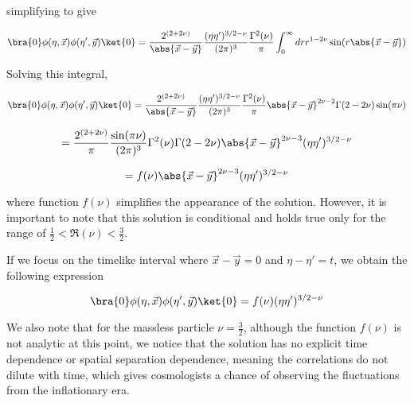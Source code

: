 \documentclass[a4paper,11pt]{article}
\numberwithin{equation}{section}
\numberwithin{figure}{section}
\begin{document}
\begin{large}
simplifying to give

\begin{equation}
\label{2pointsol eta<<1}    
    \bra{0} \phi(\eta,\Vec{x})\phi(\eta',\Vec{y})\ket{0}=\frac{2^{(2+2\nu)}}{\abs{\Vec{x}-\Vec{y}}}\frac{(\eta\eta')^{3/2-\nu}}{(2\pi)^3}\frac{\Gamma^2(\nu)}{\pi}\int^\infty_0 dr r^{1-2\nu} \sin(r \abs{\Vec{x}-\Vec{y}}) 
\end{equation}


\newpage

Solving this integral,

\begin{equation}
\label{2pointfinalsol eta<<1}    
    \bra{0} \phi(\eta,\Vec{x})\phi(\eta',\Vec{y})\ket{0}=\frac{2^{(2+2\nu)}}{\abs{\Vec{x}-\Vec{y}}}\frac{(\eta\eta')^{3/2-\nu}}{(2\pi)^3}\frac{\Gamma^2(\nu)}{\pi} \abs{\Vec{x}-\Vec{y}}^{2\nu-2}\Gamma(2-2\nu) \sin(\pi\nu)
\end{equation}

\begin{equation}
\label{2pointfinalsol2 eta<<1}    
    =\frac{2^{(2+2\nu)}}{\pi}\frac{\sin(\pi\nu)}{(2\pi)^3}\Gamma^2(\nu) \Gamma(2-2\nu)\abs{\Vec{x}-\Vec{y}}^{2\nu-3} (\eta\eta')^{3/2-\nu}
\end{equation}

\begin{equation}
\label{2pointfinalsol3 eta<<1}    
    =f(\nu)\abs{\Vec{x}-\Vec{y}}^{2\nu-3} (\eta\eta')^{3/2-\nu}
\end{equation}


where function $f(\nu)$ simplifies the appearance of the solution. However, it is important to note that this solution is conditional and holds true only for the range of $\frac{1}{2}<\Re(\nu)<\frac{3}{2}$.

If we focus on the timelike interval where $\Vec{x}-\Vec{y}=0$ and $\eta-\eta'=t$, we obtain the following expression


\begin{equation}
\label{2point eta<<1 x-y=0}
    \bra{0} \phi(\eta,\Vec{x})\phi(\eta',\Vec{y})\ket{0}=f(\nu) (\eta\eta')^{3/2-\nu}
\end{equation}


We also note that for the massless particle $\nu=\frac{3}{2}$, although the function $f(\nu)$ is not analytic at this point, we notice that the solution has no explicit time dependence or spatial separation dependence, meaning the correlations do not dilute with time, which gives cosmologists a chance of observing the fluctuations from the inflationary era.  


\end{large}
\end{document}
